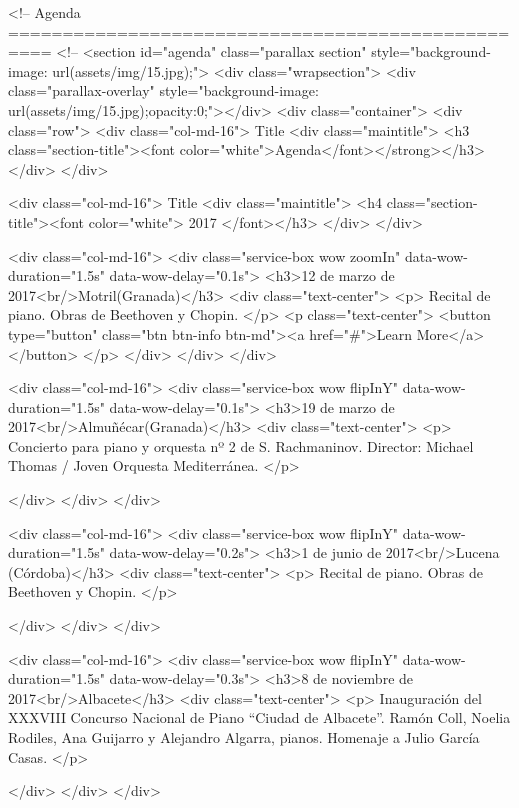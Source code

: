 <!-- Agenda
	==================================================
<!-- <section id="agenda" class="parallax section" style="background-image: url(assets/img/15.jpg);">
 <div class="wrapsection">
	<div class="parallax-overlay" style="background-image: url(assets/img/15.jpg);opacity:0;"></div>
	<div class="container">
		<div class="row">
			<div class="col-md-16">
				 Title
				<div class="maintitle">
					<h3 class="section-title"><font color="white">Agenda</font></strong></h3>
				</div>
			</div>

						<div class="col-md-16">
				 Title
				<div class="maintitle">
					<h4 class="section-title"><font color="white"> 2017 </font></h3>
				</div>
			</div>

			<div class="col-md-16">
				<div class="service-box wow zoomIn" data-wow-duration="1.5s" data-wow-delay="0.1s">
					<h3>12 de marzo de 2017<br/>Motril(Granada)</h3>
					<div class="text-center">
						<p>
							Recital de piano. Obras de Beethoven y Chopin.
						</p>
						<p class="text-center">
							<button type="button" class="btn btn-info btn-md"><a href="#">Learn More</a></button>
						</p>
					</div>
				</div>
			</div>

			<div class="col-md-16">
				<div class="service-box wow flipInY" data-wow-duration="1.5s" data-wow-delay="0.1s">
					<h3>19 de marzo de 2017<br/>Almuñécar(Granada)</h3>
					<div class="text-center">
						<p>
							Concierto para piano y orquesta nº 2 de S. Rachmaninov. Director: Michael Thomas / Joven Orquesta Mediterránea.
						</p>

                    </div>
				</div>
			</div>

			<div class="col-md-16">
				<div class="service-box wow flipInY" data-wow-duration="1.5s" data-wow-delay="0.2s">
					<h3>1 de junio de 2017<br/>Lucena (Córdoba)</h3>
					<div class="text-center">
						<p>
							Recital de piano. Obras de Beethoven y Chopin.
						</p>

                    </div>
				</div>
			</div>

			<div class="col-md-16">
				<div class="service-box wow flipInY" data-wow-duration="1.5s" data-wow-delay="0.3s">
					<h3>8 de noviembre de 2017<br/>Albacete</h3>
					<div class="text-center">
						<p>
							Inauguración del XXXVIII Concurso Nacional de Piano “Ciudad de Albacete”. Ramón Coll, Noelia Rodiles, Ana Guijarro y Alejandro Algarra, pianos. Homenaje a Julio García Casas.
						</p>

                    </div>
				</div>
			</div>

